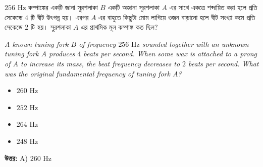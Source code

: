 \documentclass[12pt, a4paper]{article}
\begin{document}
\begin{tcolorbox}[questionbox={প্রশ্ন (Question) 5}]
    \noindent
    $256\text{ Hz}$ কম্পাঙ্কের একটি জানা সুরশলাকা $B$ একটি অজানা সুরশলাকা $A$ এর সাথে একত্রে শব্দায়িত করা হলে প্রতি সেকেন্ডে $4$ টি বীট উৎপন্ন হয়। এরপর $A$ এর বাহুতে কিছুটা মোম লাগিয়ে ওজন বাড়ানো হলে বীট সংখ্যা কমে প্রতি সেকেন্ডে $2$ টি হয়। সুরশলাকা $A$ এর প্রাথমিক মূল কম্পাঙ্ক কত ছিল?
    
    \vspace{0.8em}
    \begin{english}
    \noindent\textit{\color{darkgray}
    A known tuning fork $B$ of frequency $256\text{ Hz}$ sounded together with an unknown tuning fork $A$ produces $4$ beats per second. When some wax is attached to a prong of $A$ to increase its mass, the beat frequency decreases to $2$ beats per second. What was the original fundamental frequency of tuning fork $A$?
    }
    \end{english}
\end{tcolorbox}

\begin{itemize}[label={}, leftmargin=1cm, itemsep=0.5em]
    \item[\textbf{A)}] $260\text{ Hz}$
    \item[\textbf{B)}] $252\text{ Hz}$
    \item[\textbf{C)}] $264\text{ Hz}$
    \item[\textbf{D)}] $248\text{ Hz}$
\end{itemize}

\vspace{0.5em}
\begin{tcolorbox}[answerbox]
    \textbf{\color{success} উত্তর:} A) $260\text{ Hz}$
\end{tcolorbox}
\vspace{1em}
\end{document}
